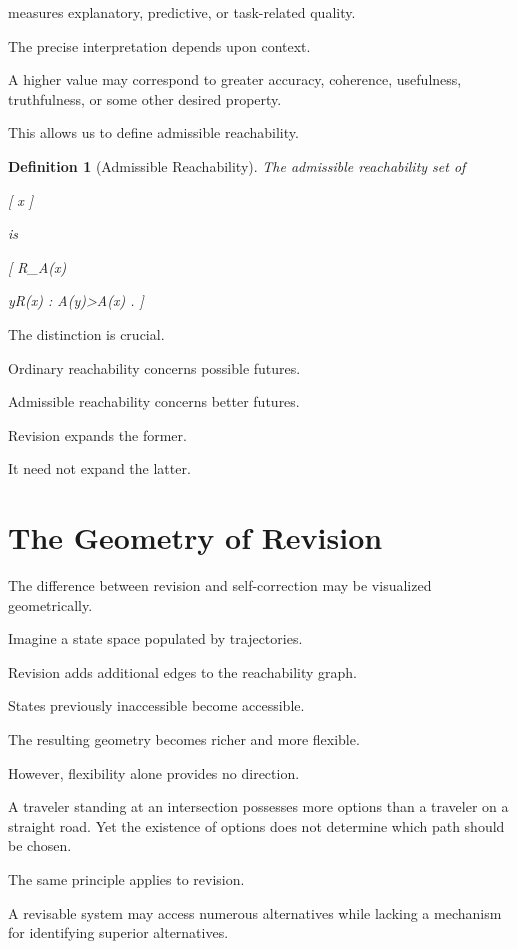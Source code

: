 \documentclass[11pt,oneside,openany]{book}
\newtheorem{definition}{Definition}[chapter] \newtheorem{theorem}{Theorem}[chapter] \newtheorem{proposition}{Proposition}[chapter] \newtheorem{lemma}{Lemma}[chapter] \newtheorem{corollary}{Corollary}[chapter] \newtheorem{remark}{Remark}[chapter]
\begin{document}
measures explanatory, predictive, or task-related quality.

The precise interpretation depends upon context.

A higher value may correspond to greater accuracy, coherence, usefulness, truthfulness, or some other desired property.

This allows us to define admissible reachability.

\begin{definition}[Admissible Reachability]

The admissible reachability set of

[
x
]

is

[
R_A(x)

{
y\in R(x)
:
A(y)>A(x)
}.
]

\end{definition}

The distinction is crucial.

Ordinary reachability concerns possible futures.

Admissible reachability concerns better futures.

Revision expands the former.

It need not expand the latter.

\section{The Geometry of Revision}

The difference between revision and self-correction may be visualized geometrically.

Imagine a state space populated by trajectories.

Revision adds additional edges to the reachability graph.

States previously inaccessible become accessible.

The resulting geometry becomes richer and more flexible.

However, flexibility alone provides no direction.

A traveler standing at an intersection possesses more options than a traveler on a straight road. Yet the existence of options does not determine which path should be chosen.

The same principle applies to revision.

A revisable system may access numerous alternatives while lacking a mechanism for identifying superior alternatives.
\end{document}
